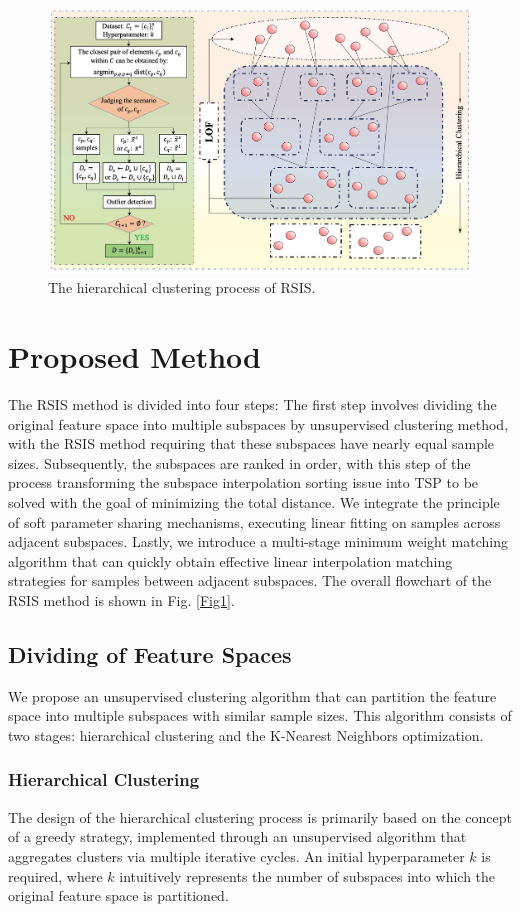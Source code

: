 \documentclass[lettersize,journal]{IEEEtran}
\begin{document}
\begin{figure}[!t]
  \centering
  \includegraphics[width=4.5in]{Fig2.png}
  \caption{The hierarchical clustering process of RSIS.}
  \label{Fig2}
\end{figure}

\section{Proposed Method}
The RSIS method is divided into four steps: The first step involves 
dividing the original feature space into multiple subspaces by 
unsupervised clustering method, with the RSIS method requiring 
that these subspaces have nearly equal sample sizes. Subsequently, the subspaces are ranked in order, with this step of 
the process transforming the subspace interpolation sorting issue 
into TSP to be solved with the goal of 
minimizing the total distance. We integrate the principle of soft parameter sharing mechanisms, 
executing linear fitting on samples across adjacent subspaces. Lastly, we introduce a multi-stage minimum weight matching algorithm 
that can quickly obtain effective linear interpolation matching 
strategies for samples between adjacent subspaces. The overall 
flowchart of the RSIS method is shown in Fig. \ref{Fig1}.

\subsection{Dividing of Feature Spaces}
We propose an unsupervised clustering algorithm that can 
partition the feature space into multiple subspaces with 
similar sample sizes. This algorithm consists of two stages: 
hierarchical clustering and the K-Nearest Neighbors 
optimization.

\subsubsection{Hierarchical Clustering}
The design of the hierarchical clustering process is 
primarily based on the concept of a greedy strategy, 
implemented through an unsupervised algorithm that 
aggregates clusters via multiple iterative cycles. 
An initial hyperparameter $k$ is required, where $k$ 
intuitively represents the number of subspaces into which 
the original feature space is partitioned. 
\end{document}
